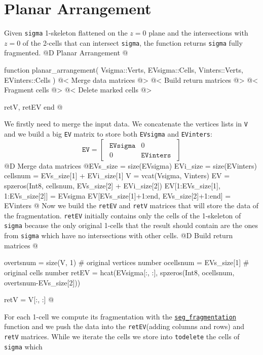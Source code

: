 \documentclass[10pt,oneside]{article}
\begin{document}
\section{Planar Arrangement}
Given \texttt{sigma} 1-skeleton flattened on the $z=0$ plane and the intersections with $z=0$ of the 2-cells
that can intersect \texttt{sigma}, the function returns \texttt{sigma} fully fragmented.
@D Planar Arrangement
@{function planar_arrangement(
    Vsigma::Verts, EVsigma::Cells, 
    Vinters::Verts, EVinters::Cells
)
    @< Merge data matrices @>
    @< Build return matrices @>
    @< Fragment cells @>
    @< Delete marked cells @>

    retV, retEV
end
@}
We firstly need to merge the input data. We concatenate the vertices lists in \texttt{V} and 
we build a big \texttt{EV} matrix to store both \texttt{EVsigma} and \texttt{EVinters}:
\begin{equation}
    \texttt{EV} = 
    \begin{bmatrix}
        \begin{array}{c|c}
            \texttt{EVsigma} & 0 \\ 
            \hline
            0 & \texttt{EVinters}
        \end{array}
    \end{bmatrix}
\end{equation}
@D Merge data matrices
@{EVs_size = size(EVsigma)
EVi_size = size(EVinters)
cellsnum = EVs_size[1] + EVi_size[1]
V = vcat(Vsigma, Vinters)
EV = spzeros(Int8, cellsnum, EVs_size[2] + EVi_size[2])
EV[1:EVs_size[1], 1:EVs_size[2]] = EVsigma
EV[EVs_size[1]+1:end, EVs_size[2]+1:end] = EVinters
@}
Now we build the \texttt{retEV} and \texttt{retV} matrices that will store 
the data of the fragmentation. \texttt{retEV} initially contains only the cells 
of the 1-skeleton of \texttt{sigma} because the only original 1-cells that the 
result should contain are the ones from \texttt{sigma} which have no intersections 
with other cells.
@D Build return matrices
@{overtsnum = size(V, 1)  # original vertices number
ocellsnum = EVs_size[1]  # original cells number
retEV = hcat(EVsigma[:, :], spzeros(Int8, ocellsnum, overtsnum-EVs_size[2]))

retV = V[:, :]
@}
For each 1-cell we compute its fragmentation with the \hyperref[seg_fragmentation]{\texttt{seg\_fragmentation}} 
function and we push the data into the \texttt{retEV}(adding columns and rows) and \texttt{retV} matrices.
While we iterate the cells we store into \texttt{todelete} the cells of \texttt{sigma} which 
\end{document}
